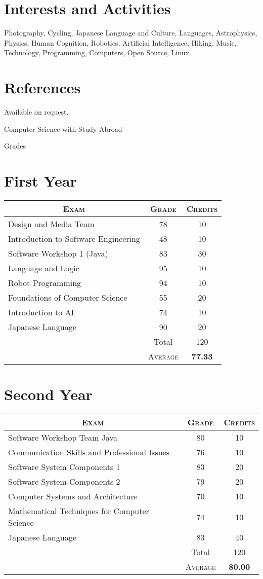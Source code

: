\documentclass[a4paper,10pt]{article}
\begin{document}
\section{Interests and Activities}
Photography, Cycling, Japanese Language and Culture, Languages,
Astrophysics, Physics, Human Cognition, Robotics, Artificial
Intelligence, Hiking, Music, Technology, Programming, Computers, Open
Source, Linux
\section{References}
Available on request.

\newpage
\par{\centering\Large \hypertarget{bham_ug}{Computer Science with
    Study Abroad}\par}\large{\centering Grades\par}\normalsize
\begin{center}
  \section{First Year}
  \begin{tabular}{lcc}
    \multicolumn{1}{c}{\textsc{Exam}}&\textsc{Grade}&\textsc{Credits}\\ \hline
    Design and Media Team&78&	10\\
    Introduction to Software Engineering	&48&	10\\
    Software Workshop 1 (Java)	&83&	30\\
    Language and Logic	&95&	10\\
    Robot Programming	&94&	10\\
    Foundations of Computer Science	&55	&20\\
    Introduction to AI	&74&	10\\
    Japanese Language	&90&	20\\\cline{2-3}
    & Total&120\\
    &\textsc{Average}&\textbf{77.33}
  \end{tabular}
  \section{Second Year}
  \begin{tabular}{lcc}
    \multicolumn{1}{c}{\textsc{Exam}}&\textsc{Grade}&\textsc{Credits}\\ \hline
    Software Workshop Team Java&80&	10\\
    Communication Skills and Professional Issues	&76&	10\\
    Software System Components 1	&83&	20\\
    Software System Components 2	&79&	20\\
    Computer Systems and Architecture	&70&	10\\
    Mathematical Techniques for Computer Science	&74	&10\\
    Japanese Language	&83&	40\\\cline{2-3}
    & Total&120\\
    &\textsc{Average}&\textbf{80.00}
  \end{tabular}
\end{center}
\end{document}
